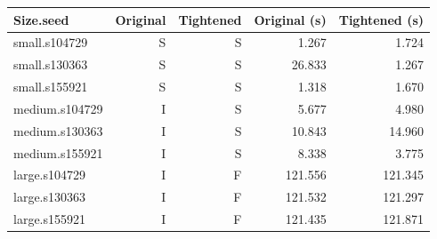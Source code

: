 \begin{tabular}{lrrrr}
\toprule
Size.seed & Original & Tightened & Original (s) & Tightened (s) \\
\midrule
small.s104729 & S & S & 1.267 & 1.724 \\
small.s130363 & S & S & 26.833 & 1.267 \\
small.s155921 & S & S & 1.318 & 1.670 \\
medium.s104729 & I & S & 5.677 & 4.980 \\
medium.s130363 & I & S & 10.843 & 14.960 \\
medium.s155921 & I & S & 8.338 & 3.775 \\
large.s104729 & I & F & 121.556 & 121.345 \\
large.s130363 & I & F & 121.532 & 121.297 \\
large.s155921 & I & F & 121.435 & 121.871 \\
\bottomrule
\end{tabular}
